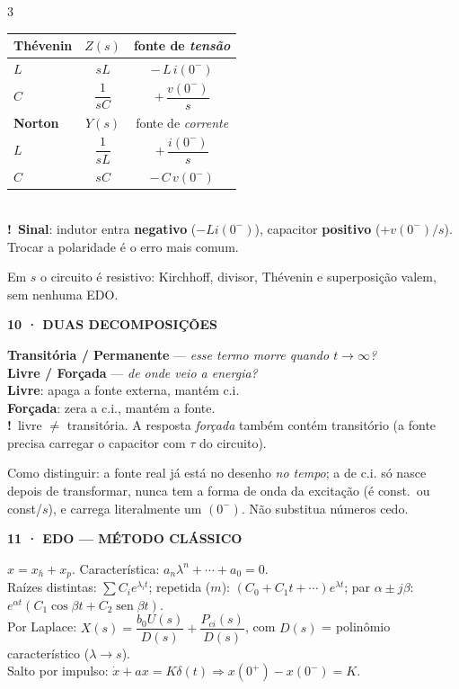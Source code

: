 \documentclass[10pt,a4paper]{article}
\renewcommand{\arraystretch}{1.05}
\newcommand{\sect}[1]{\vspace{1.2mm}{\color{acc}\rule{\linewidth}{0.9pt}}\vspace{-0.3mm}\par
  {\footnotesize\bfseries\color{acc}\MakeUppercase{#1}}\par\vspace{0.6mm}}
\newcommand{\sub}[1]{\vspace{0.8mm}{\bfseries #1}\par\vspace{0.3mm}}
\newcommand{\warn}[1]{{\color{amb}\textbf{!}~#1}\par\vspace{0.4mm}}
\newcommand{\note}[1]{{\color{gry}#1}\par\vspace{0.4mm}}
\newcommand{\ci}{0^{-}}
\newcommand{\cip}{0^{+}}
\begin{document}
\begin{multicols}{3}
\sub{Equivalentes (fonte de c.i.)}
{\renewcommand{\arraystretch}{1.35}
\begin{tabular}{@{}l@{\quad}c@{\quad}c@{}}
\textbf{Thévenin} & $Z(s)$ & fonte de \emph{tensão}\\
\hline
$L$ & $sL$ & $-\,L\,i(\ci)$\\
$C$ & $\dfrac{1}{sC}$ & $+\,\dfrac{v(\ci)}{s}$\\[1mm]
\textbf{Norton} & $Y(s)$ & fonte de \emph{corrente}\\
\hline
$L$ & $\dfrac{1}{sL}$ & $+\,\dfrac{i(\ci)}{s}$\\
$C$ & $sC$ & $-\,C\,v(\ci)$\\
\end{tabular}}\\[1mm]
\warn{\textbf{Sinal}: indutor entra \textbf{negativo} ($-Li(\ci)$), capacitor \textbf{positivo} ($+v(\ci)/s$). Trocar a polaridade é o erro mais comum.}
\note{Em $s$ o circuito é resistivo: Kirchhoff, divisor, Thévenin e superposição valem, sem nenhuma EDO.}

\sect{10 · Duas decomposições}
\textbf{Transitória / Permanente} — \emph{esse termo morre quando $t\to\infty$?}\\[0.4mm]
\textbf{Livre / Forçada} — \emph{de onde veio a energia?}\\[0.6mm]
\textbf{Livre}: apaga a fonte externa, mantém c.i.\\
\textbf{Forçada}: zera a c.i., mantém a fonte.\\[0.4mm]
\warn{livre $\ne$ transitória. A resposta \emph{forçada} também contém transitório (a fonte precisa carregar o capacitor com $\tau$ do circuito).}
\note{Como distinguir: a fonte real já está no desenho \emph{no tempo}; a de c.i. só nasce depois de transformar, nunca tem a forma de onda da excitação (é const.\ ou const/$s$), e carrega literalmente um $(\ci)$. Não substitua números cedo.}

\sect{11 · EDO — método clássico}
$x=x_h+x_p$. Característica: $a_n\lambda^n+\cdots+a_0=0$.\\[0.4mm]
Raízes distintas: $\sum C_ie^{\lambda_it}$;\; repetida ($m$): $(C_0{+}C_1t{+}\cdots)e^{\lambda t}$;\; par $\alpha\pm j\beta$: $e^{\alpha t}(C_1\cos\beta t+C_2\operatorname{sen}\beta t)$.\\[0.4mm]
Por Laplace: $X(s)=\dfrac{b_0U(s)}{D(s)}+\dfrac{P_{ci}(s)}{D(s)}$, com $D(s)$ = polinômio característico ($\lambda\to s$).\\[0.4mm]
Salto por impulso: $\dot x+ax=K\delta(t)\Rightarrow x(\cip)-x(\ci)=K$.


\end{multicols}
\end{document}

